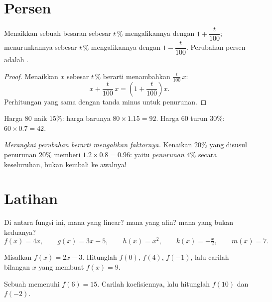 \section{Persen}

\begin{proposition}\label{prop:g9:linfunc:percent}
Menaikkan sebuah besaran sebesar $t\,\%$ mengalikannya dengan
$1 + \dfrac{t}{100}$; menurunkannya sebesar $t\,\%$ mengalikannya
dengan $1 - \dfrac{t}{100}$. Perubahan persen adalah .
\end{proposition}

\begin{proof}
Menaikkan $x$ sebesar $t\,\%$ berarti menambahkan $\frac{t}{100}\,x$:
\[
x + \frac{t}{100}\,x = \left(1 + \frac{t}{100}\right) x .
\]
Perhitungan yang sama dengan tanda minus untuk penurunan.
\end{proof}

\begin{example}\label{ex:g9:linfunc:percent}
Harga $80$ naik $15\%$: harga barunya
$80 \times 1.15 = 92$. Harga $60$ turun $30\%$:
$60 \times 0.7 = 42$.

\emph{Merangkai perubahan berarti mengalikan faktornya.} Kenaikan
$20\%$ yang disusul penurunan $20\%$ memberi
$1.2 \times 0.8 = 0.96$: yaitu \emph{penurunan} $4\%$ secara
keseluruhan, bukan kembali ke awalnya!
\end{example}

\section{Latihan}

\begin{exercise}[$\star$]\label{exo:g9:linfunc:1}
Di antara fungsi ini, mana yang linear? mana yang afin? mana yang bukan keduanya?
\[
f(x) = 4x, \qquad
g(x) = 3x - 5, \qquad
h(x) = x^2, \qquad
k(x) = -\tfrac x2, \qquad
m(x) = 7 .
\]
\end{exercise}

\begin{exercise}[$\star$]\label{exo:g9:linfunc:2}
Misalkan $f(x) = 2x - 3$. Hitunglah $f(0)$, $f(4)$, $f(-1)$, lalu
carilah bilangan $x$ yang membuat $f(x) = 9$.
\end{exercise}

\begin{exercise}[$\star$]\label{exo:g9:linfunc:3}
Sebuah  memenuhi $f(6) = 15$. Carilah koefisiennya, lalu
hitunglah $f(10)$ dan $f(-2)$.
\end{exercise}


